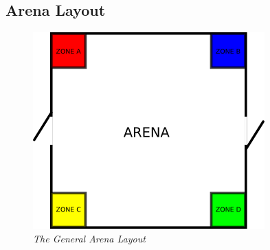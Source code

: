 \clearpage
\newpage

\subsection {Arena Layout}

\begin {figure}[h]
\begin {center}
\includegraphics[keepaspectratio, scale =1]{../arena/arenagame2.png}
\caption{\small{\emph{The General Arena Layout}}}
\label {fig:arena}
\end {center}
\end {figure}

